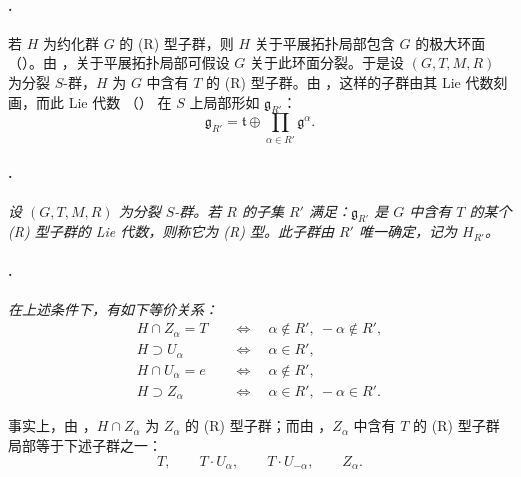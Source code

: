 \paragraph{.}
若 \(H\) 为约化群 \(G\) 的 \textup{(R)} 型子群，则 \(H\) 关于平展拓扑局部包含 \(G\) 的极大环面 \textup{（）}。由 ，关于平展拓扑局部可假设 \(G\) 关于此环面分裂。于是设 \((G,T,M,R)\) 为分裂 \(S\)-群，\(H\) 为 \(G\) 中含有 \(T\) 的 \textup{(R)} 型子群。由 ，这样的子群由其 Lie 代数刻画，而此 Lie 代数 \textup{（）} 在 \(S\) 上局部形如 \(\mathfrak g_{R'}\)：
\[
  \mathfrak g_{R'}
  =
  \mathfrak t
  \oplus
  \prod_{\alpha\in R'}\mathfrak g^\alpha.
\]

\paragraph{.}
\textit{设 \((G,T,M,R)\) 为分裂 \(S\)-群。若 \(R\) 的子集 \(R'\) 满足：\(\mathfrak g_{R'}\) 是 \(G\) 中含有 \(T\) 的某个 \textup{(R)} 型子群的 Lie 代数，则称它为 \textup{(R)} 型。此子群由 \(R'\) 唯一确定，记为 \(H_{R'}\)。}

\paragraph{.}
\textit{在上述条件下，有如下等价关系：}
\[
\begin{aligned}
  H\cap Z_\alpha=T
    &\quad\Longleftrightarrow\quad
      \alpha\notin R',\ -\alpha\notin R',\\
  H\supset U_\alpha
    &\quad\Longleftrightarrow\quad
      \alpha\in R',\\
  H\cap U_\alpha=e
    &\quad\Longleftrightarrow\quad
      \alpha\notin R',\\
  H\supset Z_\alpha
    &\quad\Longleftrightarrow\quad
      \alpha\in R',\ -\alpha\in R'.
\end{aligned}
\]

事实上，由 ，\(H\cap Z_\alpha\) 为 \(Z_\alpha\) 的 \textup{(R)} 型子群；而由 ，\(Z_\alpha\) 中含有 \(T\) 的 \textup{(R)} 型子群局部等于下述子群之一：
\[
  T,\qquad T\cdot U_\alpha,\qquad
  T\cdot U_{-\alpha},\qquad Z_\alpha.
\]


